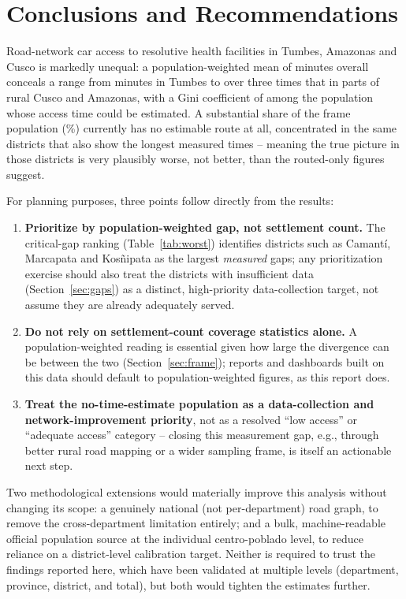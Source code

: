 \section{Conclusions and Recommendations}
\label{sec:conclusions}

Road-network car access to resolutive health facilities in Tumbes, Amazonas and Cusco is markedly unequal: a population-weighted mean of \MeanAccessTotal{} minutes overall conceals a range from \MeanAccessTumbes{} minutes in Tumbes to over three times that in parts of rural Cusco and Amazonas, with a Gini coefficient of \GiniCalibrated{} among the population whose access time could be estimated. A substantial share of the frame population (\CovNoTimeTotal\%) currently has no estimable route at all, concentrated in the same districts that also show the longest measured times -- meaning the true picture in those districts is very plausibly worse, not better, than the routed-only figures suggest.

For planning purposes, three points follow directly from the results:
\begin{enumerate}
  \item \textbf{Prioritize by population-weighted gap, not settlement count.} The critical-gap ranking (Table~\ref{tab:worst}) identifies districts such as Camantí, Marcapata and Kosñipata as the largest \emph{measured} gaps; any prioritization exercise should also treat the districts with insufficient data (Section~\ref{sec:gaps}) as a distinct, high-priority data-collection target, not assume they are already adequately served.
  \item \textbf{Do not rely on settlement-count coverage statistics alone.} A population-weighted reading is essential given how large the divergence can be between the two (Section~\ref{sec:frame}); reports and dashboards built on this data should default to population-weighted figures, as this report does.
  \item \textbf{Treat the no-time-estimate population as a data-collection and network-improvement priority}, not as a resolved ``low access'' or ``adequate access'' category -- closing this measurement gap, e.g., through better rural road mapping or a wider sampling frame, is itself an actionable next step.
\end{enumerate}

Two methodological extensions would materially improve this analysis without changing its scope: a genuinely national (not per-department) road graph, to remove the cross-department limitation entirely; and a bulk, machine-readable official population source at the individual centro-poblado level, to reduce reliance on a district-level calibration target. Neither is required to trust the findings reported here, which have been validated at multiple levels (department, province, district, and total), but both would tighten the estimates further.
